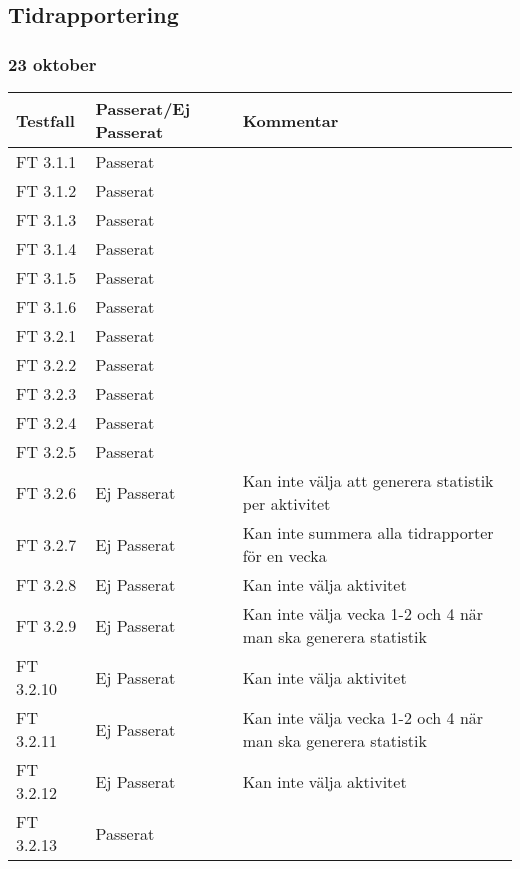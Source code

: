 \documentclass[a4paper]{article}
\begin{document}







\subsection{Tidrapportering}

\subsubsection{23 oktober}
\begin{tabular}{| l | l | p{9cm} |}
\hline
Testfall &  Passerat/Ej Passerat & Kommentar\\
\hline
FT 3.1.1 & Passerat & \\
\hline
FT 3.1.2 & Passerat & \\
\hline
FT 3.1.3 & Passerat & \\
\hline
FT 3.1.4 & Passerat & \\
\hline
FT 3.1.5 & Passerat & \\
\hline
FT 3.1.6 & Passerat & \\
\hline
FT 3.2.1 & Passerat & \\
\hline
FT 3.2.2 & Passerat & \\
\hline
FT 3.2.3 & Passerat & \\
\hline
FT 3.2.4 & Passerat & \\
\hline
FT 3.2.5 & Passerat & \\
\hline
FT 3.2.6 & Ej Passerat & Kan inte välja att generera statistik per aktivitet \\
\hline
FT 3.2.7 & Ej Passerat & Kan inte summera alla tidrapporter för en vecka \\
\hline
FT 3.2.8 & Ej Passerat &  Kan inte välja aktivitet \\
\hline
FT 3.2.9 & Ej Passerat &  Kan inte välja vecka 1-2 och 4 när man ska generera statistik\\
\hline
FT 3.2.10 & Ej Passerat & Kan inte välja aktivitet \\
\hline
FT 3.2.11 & Ej Passerat & Kan inte välja vecka 1-2 och 4 när man ska generera statistik \\
\hline
FT 3.2.12 & Ej Passerat & Kan inte välja aktivitet \\
\hline
FT 3.2.13 & Passerat & \\

\end{tabular}
\end{document}
